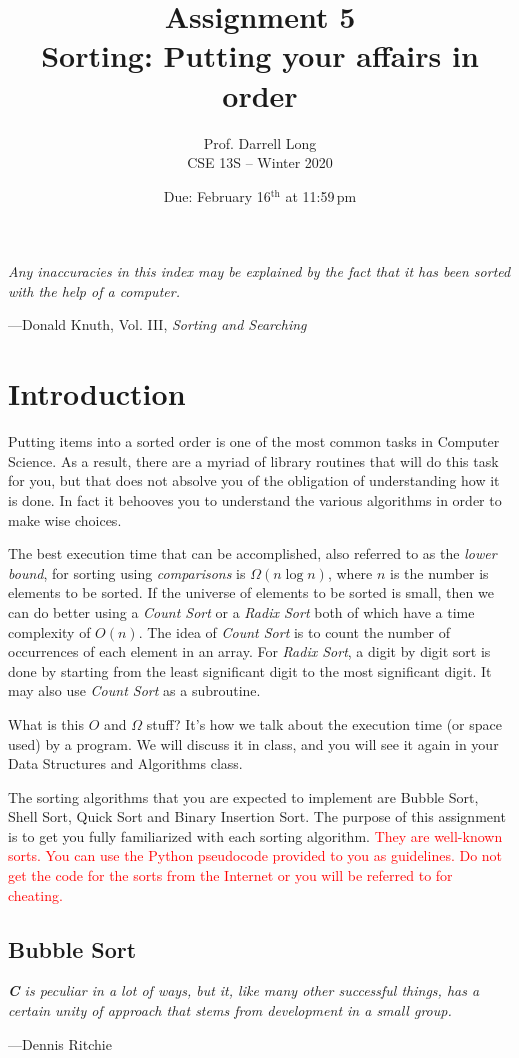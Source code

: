 \documentclass[11pt]{article}
\title{Assignment 5 \\ Sorting: Putting your affairs in order}
\author{Prof. Darrell Long \\
CSE 13S -- Winter 2020}
\date{Due: February 16$^\text{th}$ at 11:59\,pm}
\begin{document}
\maketitle
{}\textwidth
\epigraph{\emph{Any inaccuracies in this index may be explained by the fact
that it has been sorted with the help of a computer.}}{---Donald Knuth, Vol.
III, \emph{Sorting and Searching}}


\section{Introduction}
Putting items into a sorted order is one of the most common tasks in Computer
Science. As a result, there are a myriad of library routines that will do
this task for you, but that does not absolve you of the obligation of
understanding how it is done. In fact it behooves you to understand the
various algorithms in order to make wise choices.

The best execution time that can be accomplished, also referred to as the
\emph{lower bound}, for sorting using \emph{comparisons} is $\Omega(n \log n)$,
where $n$ is the number is elements to be sorted. If the universe of elements to
be sorted is small, then we can do better using a \emph{Count Sort} or a
\emph{Radix Sort} both of which have a time complexity of $O(n)$. The idea of
\emph{Count Sort} is to count the number of occurrences of each element in an
array. For \emph{Radix Sort}, a digit by digit sort is done by starting from the
least significant digit to the most significant digit. It may also use
\emph{Count Sort} as a subroutine.

What is this $O$ and $\Omega$ stuff? It's how we talk about the execution time
(or space used) by a program. We will discuss it in class, and you will see it
again in your Data Structures and Algorithms class.

The sorting algorithms that you are expected to implement are Bubble Sort, Shell
Sort, Quick Sort and Binary Insertion Sort. The purpose of this assignment is to
get you fully familiarized with each sorting algorithm. \textcolor{red}{They are
    well-known sorts. You can use the Python pseudocode provided to you as
    guidelines. Do not get the code for the sorts from the Internet or you will
be referred to for cheating.}

\subsection{Bubble Sort}
\epigraph{\emph{\textbf{C} is peculiar in a lot of ways, but it, like many other
successful things, has a certain unity of approach that stems from development
in a small group.}}{---Dennis Ritchie}
\end{document}

